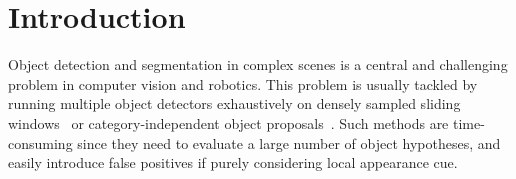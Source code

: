 \section{Introduction}

Object detection and segmentation in complex scenes is a central and challenging problem in computer vision and robotics.
This problem is usually tackled by running multiple object detectors exhaustively on densely sampled sliding windows~\cite{felzenszwalb2010object} or category-independent object proposals~\cite{carreira2012cpmc,van2011segmentation,arbelaez2014multiscale}. 
Such methods are time-consuming since they need to evaluate a large number of object hypotheses, and easily introduce false positives if purely considering local appearance cue.

